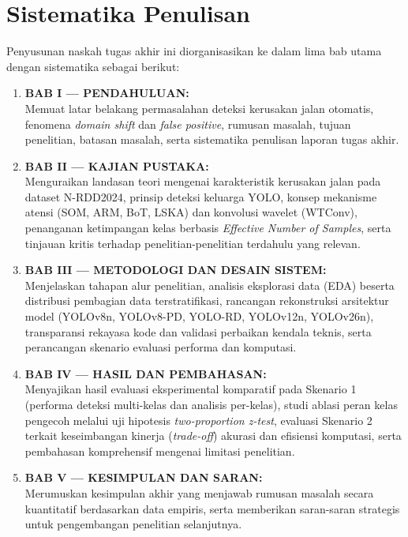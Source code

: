 \section{Sistematika Penulisan}
\label{sec:sistematika_penulisan}
Penyusunan naskah tugas akhir ini diorganisasikan ke dalam lima bab utama dengan sistematika sebagai berikut:
\begin{enumerate}
  \item \textbf{BAB I — PENDAHULUAN:}\\
        Memuat latar belakang permasalahan deteksi kerusakan jalan otomatis, fenomena \textit{domain shift} dan \textit{false positive}, rumusan masalah, tujuan penelitian, batasan masalah, serta sistematika penulisan laporan tugas akhir.
  \item \textbf{BAB II — KAJIAN PUSTAKA:}\\
        Menguraikan landasan teori mengenai karakteristik kerusakan jalan pada dataset N-RDD2024, prinsip deteksi keluarga YOLO, konsep mekanisme atensi (SOM, ARM, BoT, LSKA) dan konvolusi wavelet (WTConv), penanganan ketimpangan kelas berbasis \textit{Effective Number of Samples}, serta tinjauan kritis terhadap penelitian-penelitian terdahulu yang relevan.
  \item \textbf{BAB III — METODOLOGI DAN DESAIN SISTEM:}\\
        Menjelaskan tahapan alur penelitian, analisis eksplorasi data (EDA) beserta distribusi pembagian data terstratifikasi, rancangan rekonstruksi arsitektur model (YOLOv8n, YOLOv8-PD, YOLO-RD, YOLOv12n, YOLOv26n), transparansi rekayasa kode dan validasi perbaikan kendala teknis, serta perancangan skenario evaluasi performa dan komputasi.
  \item \textbf{BAB IV — HASIL DAN PEMBAHASAN:}\\
        Menyajikan hasil evaluasi eksperimental komparatif pada Skenario 1 (performa deteksi multi-kelas dan analisis per-kelas), studi ablasi peran kelas pengecoh melalui uji hipotesis \textit{two-proportion z-test}, evaluasi Skenario 2 terkait keseimbangan kinerja (\textit{trade-off}) akurasi dan efisiensi komputasi, serta pembahasan komprehensif mengenai limitasi penelitian.
  \item \textbf{BAB V — KESIMPULAN DAN SARAN:}\\
        Merumuskan kesimpulan akhir yang menjawab rumusan masalah secara kuantitatif berdasarkan data empiris, serta memberikan saran-saran strategis untuk pengembangan penelitian selanjutnya.
\end{enumerate}

